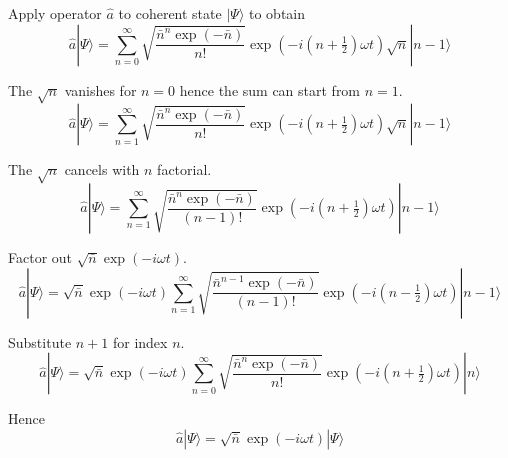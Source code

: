 \documentclass[12pt]{article}
\begin{document}
Apply operator $\hat a$ to coherent state $|\Psi\rangle$ to obtain
\begin{equation*}
\hat a|\Psi\rangle
=\sum_{n=0}^\infty
\sqrt{\frac{\bar n^n\exp(-\bar n)}{n!}}
\exp\left(-i\left(n+\tfrac{1}{2}\right)\omega t\right)
\sqrt n|n-1\rangle
\end{equation*}

The $\sqrt n$ vanishes for $n=0$ hence the sum can start from $n=1$.
\begin{equation*}
\hat a|\Psi\rangle
=\sum_{n=1}^\infty
\sqrt{\frac{\bar n^n\exp(-\bar n)}{n!}}
\exp\left(-i\left(n+\tfrac{1}{2}\right)\omega t\right)
\sqrt n|n-1\rangle
\end{equation*}

The $\sqrt n$ cancels with $n$ factorial.
\begin{equation*}
\hat a|\Psi\rangle
=\sum_{n=1}^\infty
\sqrt{\frac{\bar n^n\exp(-\bar n)}{(n-1)!}}
\exp\left(-i\left(n+\tfrac{1}{2}\right)\omega t\right)
|n-1\rangle
\end{equation*}

Factor out $\sqrt{\bar n}\exp(-i\omega t)$.
\begin{equation*}
\hat a|\Psi\rangle
=\sqrt{\bar n}\exp(-i\omega t)
\sum_{n=1}^\infty
\sqrt{\frac{\bar n^{n-1}\exp(-\bar n)}{(n-1)!}}
\exp\left(-i\left(n-\tfrac{1}{2}\right)\omega t\right)
|n-1\rangle
\end{equation*}

Substitute $n+1$ for index $n$.
\begin{equation*}
\hat a|\Psi\rangle
=\sqrt{\bar n}\exp(-i\omega t)
\sum_{n=0}^\infty
\sqrt{\frac{\bar n^n\exp(-\bar n)}{n!}}
\exp\left(-i\left(n+\tfrac{1}{2}\right)\omega t\right)
|n\rangle
\end{equation*}

Hence
\begin{equation*}
\hat a|\Psi\rangle=\sqrt{\bar n}\exp(-i\omega t)|\Psi\rangle
\end{equation*}
\end{document}
